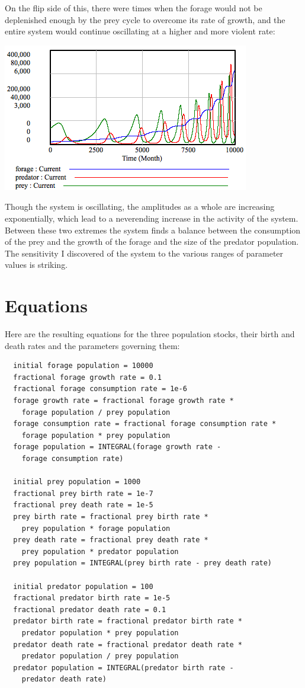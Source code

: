 \documentclass[12pt]{article}
\begin{document}
On the flip side of this, there were times when the forage would not be deplenished enough by the prey cycle to overcome its rate of growth, and the entire system would continue oscillating at a higher and more violent rate:

\includegraphics[scale=0.8]{exponentialoscillation.png}

Though the system is oscillating, the amplitudes as a whole are increasing exponentially, which lead to a neverending increase in the activity of the system.  Between these two extremes the system finds a balance between the consumption of the prey and the growth of the forage and the size of the predator population.  The sensitivity I discovered of the system to the various ranges of parameter values is striking.  


\section{Equations}

Here are the resulting equations for the three population stocks, their birth and death rates and the parameters governing them:

\begin{verbatim}
  initial forage population = 10000
  fractional forage growth rate = 0.1
  fractional forage consumption rate = 1e-6
  forage growth rate = fractional forage growth rate * 
    forage population / prey population
  forage consumption rate = fractional forage consumption rate * 
    forage population * prey population
  forage population = INTEGRAL(forage growth rate - 
    forage consumption rate)

  initial prey population = 1000
  fractional prey birth rate = 1e-7
  fractional prey death rate = 1e-5
  prey birth rate = fractional prey birth rate *
    prey population * forage population
  prey death rate = fractional prey death rate * 
    prey population * predator population
  prey population = INTEGRAL(prey birth rate - prey death rate)

  initial predator population = 100
  fractional predator birth rate = 1e-5
  fractional predator death rate = 0.1
  predator birth rate = fractional predator birth rate * 
    predator population * prey population
  predator death rate = fractional predator death rate *
    predator population / prey population
  predator population = INTEGRAL(predator birth rate -
    predator death rate)
\end{verbatim}
\end{document}
